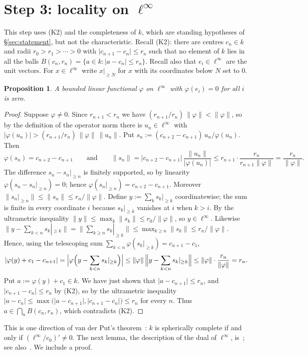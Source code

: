 \documentclass[11pt]{amsart}
\newtheorem{proposition}[theorem]{Proposition}
\theoremstyle{remark}
\newcommand{\kk}{k}
\newcommand{\linf}{\ell^\infty}
\newcommand{\abs}[1]{\lvert #1\rvert}
\newcommand{\norm}[1]{\lVert #1\rVert}
\newcommand{\1}{\mathbf{1}}
\newcommand{\tail}[2]{#2|_{\ge #1}}
\begin{document}
\section{Step 3: locality on \texorpdfstring{$\linf$}{l-infinity}}
This step uses \textup{(K2)} and the completeness of $\kk$, which are standing hypotheses of \S\ref{sec:statement}, but not
the characteristic. Recall \textup{(K2)}: there are
centres $c_n\in\kk$ and radii $r_0>r_1>\cdots>0$ with $\abs{c_{n+1}-c_n}\le r_n$ such that no element of $\kk$ lies in all the
balls $B(c_n,r_n)=\{a\in\kk:\abs{a-c_n}\le r_n\}$. Recall also that $e_i\in\linf$ are the unit vectors. For $x\in\linf$ write $\tail Nx$ for $x$ with its coordinates below $N$ set to $0$.
\begin{proposition}\label{prop:nsc}
A bounded linear functional $\varphi$ on $\linf$ with $\varphi(e_i)=0$ for all $i$ is zero.
\end{proposition}
\begin{proof}
Suppose
$\varphi\ne0$. Since $r_{n+1}<r_n$ we have
$(r_{n+1}/r_n)\,\norm\varphi<\norm\varphi$, so by the definition of the operator norm there is $u_n\in\linf$ with
$\abs{\varphi(u_n)}>(r_{n+1}/r_n)\,\norm\varphi\,\norm{u_n}$. Put $s_n:=(c_{n+2}-c_{n+1})\,u_n/\varphi(u_n)$. Then
\[
\varphi(s_n)=c_{n+2}-c_{n+1}\qquad\text{and}\qquad
\norm{s_n}=\abs{c_{n+2}-c_{n+1}}\,\frac{\norm{u_n}}{\abs{\varphi(u_n)}}\le r_{n+1}\cdot\frac{r_n}{r_{n+1}\norm\varphi}=\frac{r_n}{\norm\varphi} .
\]
The difference $s_n-\tail n{s_n}$ is finitely supported, so by linearity $\varphi(s_n-\tail n{s_n})=0$; hence
$\varphi(\tail n{s_n})=c_{n+2}-c_{n+1}$. Moreover $\norm{\tail n{s_n}}\le\norm{s_n}\le r_n/\norm\varphi$. Define
$y:=\sum_k\tail k{s_k}$ coordinatewise; the sum is finite in every coordinate $i$ because $\tail k{s_k}$ vanishes at $i$ when
$k>i$. By the ultrametric inequality $\norm y\le\max_k\norm{s_k}\le r_0/\norm\varphi$, so $y\in\linf$. Likewise
$\norm{y-\sum_{k<n}\tail k{s_k}}=\norm{\sum_{k\ge n}\tail k{s_k}}\le\max_{k\ge n}\norm{s_k}\le r_n/\norm\varphi$. Hence, using the telescoping sum $\sum_{k<n}\varphi(\tail k{s_k})=c_{n+1}-c_1$,
\[
\abs{\varphi(y)+c_1-c_{n+1}}=\Bigl\lvert\varphi\Bigl(y-\sum_{k<n}\tail k{s_k}\Bigr)\Bigr\rvert
\le\norm\varphi\,\Bigl\lVert y-\sum_{k<n}\tail k{s_k}\Bigr\rVert\le\norm\varphi\cdot\frac{r_n}{\norm\varphi}=r_n .
\]
Put $a:=\varphi(y)+c_1\in\kk$. We have just shown that $\abs{a-c_{n+1}}\le r_n$, and $\abs{c_{n+1}-c_n}\le r_n$ by
\textup{(K2)}, so by the ultrametric inequality
$\abs{a-c_n}\le\max\bigl(\abs{a-c_{n+1}},\abs{c_{n+1}-c_n}\bigr)\le r_n$ for every $n$. Thus $a\in\bigcap_nB(c_n,r_n)$, which contradicts \textup{(K2)}.
\end{proof}
This is one direction of van der Put's theorem~\cite[Th\'eor\`eme~(3.2)]{vdP}: $\kk$ is spherically complete if and only if
$(\linf/c_0)'\ne0$. The next lemma, the description of the dual of $\linf$, is~\cite[Th\'eor\`eme~(4.1)]{vdP}; see
also~\cite[Ch.~4]{vR}. We include a proof.
\end{document}
